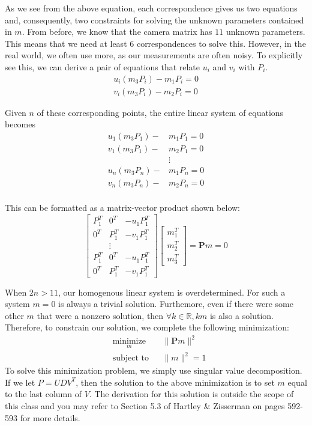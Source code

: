 \documentclass[a4paper, 12pt]{article}
\begin{document}
As we see from the above equation, each correspondence gives us two equations and, consequently, two constraints for solving the unknown parameters contained in $m$. From before, we know that the camera matrix has $11$ unknown parameters. This means that we need at least $6$ correspondences to solve this. However, in the real world, we often use more, as our measurements are often noisy. To explicitly see this, we can derive a pair of equations that relate $u_i$ and $v_i$ with $P_i$. 
\begin{align*}
u_i(m_3P_i) - m_1P_i = 0\\
v_i(m_3P_i) - m_2P_i = 0
\end{align*}

Given $n$ of these corresponding points, the entire linear system of equations becomes
\begin{align*}
u_1(m_3P_1) -& m_1P_1 = 0\\
v_1(m_3P_1) -& m_2P_1 = 0\\
&\vdots\\
u_n(m_3P_n) -& m_1P_n = 0\\
v_n(m_3P_n) -& m_2P_n = 0\\
\end{align*}

This can be formatted as a matrix-vector product shown below:
\begin{equation}
\begin{bmatrix} 
P_1^T & 0^T & -u_1P_1^T \\
0^T & P_1^T & -v_1P_1^T \\
& \vdots &\\
P_1^T & 0^T & -u_1P_1^T \\
0^T & P_1^T & -v_1P_1^T 
\end{bmatrix}
\begin{bmatrix}
m_1^T \\ m_2^T \\m_3^T
\end{bmatrix} = \mathbf{P}m = 0
\label{eq:linearsystem}
\end{equation}

When $2n > 11$, our homogenous linear system is overdetermined. For such a system $m=0$ is always a trivial solution. Furthemore, even if there were some other $m$ that were a nonzero solution, then $\forall k\in \mathbb{R},km$ is also a solution. Therefore, to constrain our solution, we complete the following minimization:
\begin{equation}
\begin{aligned}
    & \underset{m}{\text{minimize}}
    & & \|\mathbf{P}m\|^2 \\
    & \text{subject to}
    & & \|m\|^2 = 1
\end{aligned}
\end{equation}
To solve this minimization problem, we simply use singular value decomposition. If we let $P = UDV^T$, then the solution to the above minimization is to set $m$ equal to the last column of $V$. The derivation for this solution is outside the scope of this class and you may refer to Section 5.3 of Hartley \& Zisserman on pages 592-593 for more details.
\end{document}
